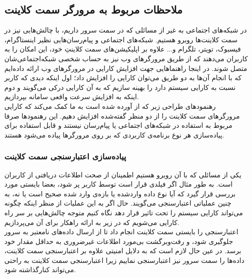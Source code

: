  
 
 \subsection{ملاحظات مربوط به مرورگر سمت کلاینت}
 در شبکه‌های اجتماعی به غیر از مسائلی که در سمت سرور داریم، با چالش‌هایی نیز در سمت کلاینت‌ها روبرو هستیم. شبکه‌های اجتماعی و پیام‌رسان‌هایی نظیر اینستاگرام، فیسبوک، تویتر، تلگرام و... علاوه‌ بر اپلیکیشن‌های سمت کلاینتِ خود، این امکان را به کاربران می‌دهند که از طریق مرورگرهای وب نیز به حساب شخصی شبکه‌اجتماعی‌شان متصل شوند. در اینجا راهنماهایی جهت افزایش کارایی در مرورگرهای وب ارائه داده‌ایم که با انجام آن‌ها به دو طریق می‌توان کارایی را افزایش داد؛ اول اینکه دیدی که کاربر نسبت به کارایی سیستم دارد را بهینه سازیم که به آن کارایی درکی  می‌گویند و دوم اینکه به افزایش سرعت واقعی  سامانه بپردازیم. \\
 رهنمودهای طراحی زیر که از  آورده شده است به ما کمک می‌کند که کارایی مرورگرهای سمت کلاینت را از دو منظر گفته‌شده افزایش دهیم. این رهنمودها صرفا مربوط به استفاده در شبکه‌های اجتماعی یا پیام‌رسان نیستند و قابل استفاده برای پیاده‌سازی هر نوع برنامه‌ی کاربردی که بر روی مرورگرها پیاده می‌شود هستند.
 \subsubsection{پیاده‌سازی اعتبارسنجی سمت کلاینت }
 
یکی از مسائلی که با آن روبرو هستیم اطمینان از صحت اطلاعات دریافتی از کاربران است. به طور مثال اگر فیلدی قرار است توسط کاربر پر شود، بعضا بایستی مورد بررسی قرار گیرد که آیا نوع داده ‌وارد‌شده یا بازه‌ی وارد شده صحیح است یا نه، به چنین عملیاتی اعتبارسنجی می‌گویند. حال اگر به این عملیات از منظر اینکه چگونه می‌تواند کارایی سیستم را تحت تاثیر قرار دهد نگاه کنیم متوجه چالش‌هایی بر سر راه کارایی می‌شویم که در زیر به ارائه راهکار برای آن می‌پردازیم.\\
اعتبارسنجی را بایستی سمت کلاینت انجام داد تا از ارسال داده‌های نامعتبر به سرور جلوگیری شود، و رفت‌وبرگشت بی‌مورد اطلاعات غیرضروری به حداقل مقدار خود برسد. در عین حال لازم است که به دلایل امنیتی علاوه بر اعتبارسنجی سمت کلاینت، داده‌ها را سمت سرور نیز اعتبارسنجی نماییم زیرا اعتبارسنجی سمت کلاینت به راحتی می‌تواند کنارگذاشته شود.
